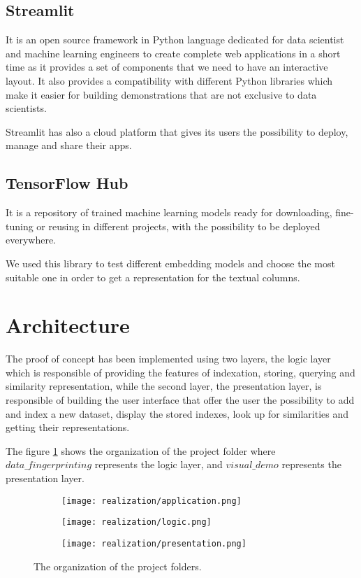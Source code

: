\subsection{Streamlit}
It is an open source framework in Python language dedicated for data scientist
and machine learning engineers to create complete web applications in a short
time as it provides a set of components that we need to have an interactive
layout. It also provides a compatibility with different Python libraries which
make it easier for building demonstrations that are not exclusive to data
scientists.

Streamlit has also a cloud platform that gives its users the possibility to
deploy, manage and share their apps.

\subsection{TensorFlow Hub}
It is a repository of trained machine learning models ready for downloading,
fine-tuning or reusing in different projects, with the possibility to be deployed
everywhere.

We used this library to test different embedding models and choose the most
suitable one in order to get a representation for the textual columns.


\section{Architecture}
The proof of concept has been implemented using two layers, the logic layer
which is responsible of providing the features of indexation, storing, querying
and similarity representation, while the second layer, the presentation layer,
is responsible of building the user interface that offer the user the
possibility to add and index a new dataset, display the stored indexes, look up
for similarities and getting their representations.

The figure \ref{fig:folder_organization} shows the organization of the project
folder where $data\_fingerprinting$ represents the logic layer, and
$visual\_demo$ represents the presentation layer.

\begin{figure}[h]
    \begin{subfigure}{.4\textwidth}
        \centering
        \texttt{[image: realization/application.png]}
    \end{subfigure}
    \begin{subfigure}{.4\textwidth}
        \centering
        \texttt{[image: realization/logic.png]}
    \end{subfigure}
    \begin{subfigure}{.4\textwidth}
        \centering
        \texttt{[image: realization/presentation.png]}
    \end{subfigure}
    \caption{The organization of the project folders.}
    \label{fig:folder_organization}
\end{figure}

